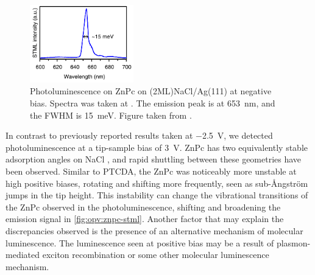 \begin{figure}
    \centering
    \includegraphics[width=0.4\textwidth]{pictures/znpc_literature.PNG}
    \caption[]{Photoluminescence on ZnPc on (2ML)NaCl/Ag(111) at negative bias. Spectra was taken at . The emission peak is at \SI{653}{nm}, and the FWHM is \SI{15}{meV}. Figure taken from \citep{zhang2017sub}.}
    \label{fig:opv:znpc_literature}
\end{figure}


In contrast to previously reported results taken at \SI{-2.5}{V}, we detected photoluminescence at a tip-sample bias of \SI{3}{V}. ZnPc has two equivalently stable adsorption angles on NaCl \citep{Miwa2016}, and rapid shuttling between these geometries have been observed. Similar to PTCDA, the ZnPc was noticeably more unstable at high positive biases, rotating and shifting more frequently, seen as sub-\AA ngstr\"om jumps in the tip height. This instability can change the vibrational transitions of the ZnPc observed in the photoluminescence, shifting and broadening the emission signal in \autoref{fig:opv:znpc-stml}. Another factor that may explain the discrepancies observed is the presence of an alternative mechanism of molecular luminescence. The luminescence seen at positive bias may be a result of plasmon-mediated exciton recombination or some other molecular luminescence mechanism.










